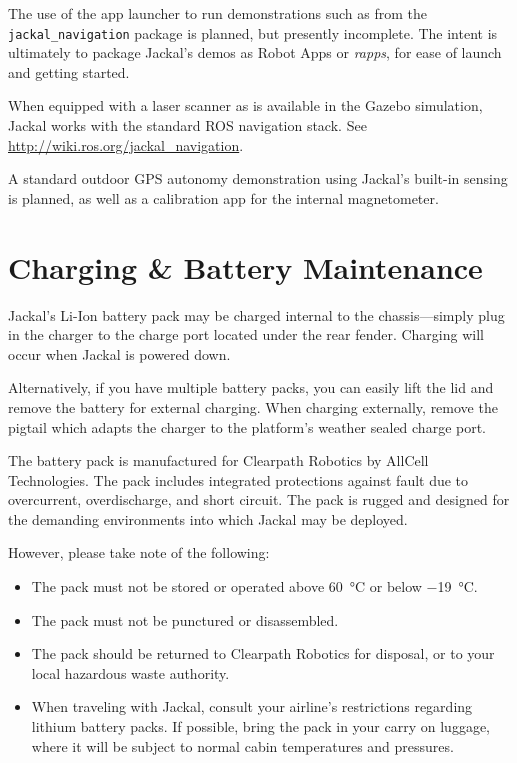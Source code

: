 \documentclass[]{clearpath-manual}
\begin{document}
\begin{warning}
The use of the app launcher to run demonstrations such as from the \lstinline{jackal_navigation}
package is planned, but presently incomplete. The intent is ultimately to package Jackal's demos as
Robot Apps or \textit{rapps}, for ease of launch and getting started.
\end{warning}

When equipped with a laser scanner as is available in the Gazebo simulation, Jackal works with the
standard ROS navigation stack. See \url{http://wiki.ros.org/jackal_navigation}.

A standard outdoor GPS autonomy demonstration using Jackal's built-in sensing is planned, as well
as a calibration app for the internal magnetometer.


\section{Charging \& Battery Maintenance}

Jackal's Li-Ion battery pack may be charged internal to the chassis---simply plug in
the charger to the charge port located under the rear fender. Charging will occur
when Jackal is powered down.

Alternatively, if you have multiple battery packs, you can easily lift the lid and
remove the battery for external charging. When charging externally, remove the pigtail
which adapts the charger to the platform's weather sealed charge port.

The battery pack is manufactured for Clearpath Robotics by AllCell Technologies. The
pack includes integrated protections against fault due to overcurrent, overdischarge,
and short circuit. The pack is rugged and designed for the demanding environments into
which Jackal may be deployed.

However, please take note of the following:

\begin{itemize}
\item The pack must not be stored or operated above \SI{60}{\celsius} or below \SI{-19}{\celsius}.
\item The pack must not be punctured or disassembled.
\item The pack should be returned to Clearpath Robotics for disposal, or to your
local hazardous waste authority.
\item When traveling with Jackal, consult your airline's restrictions regarding lithium
battery packs. If possible, bring the pack in your carry on luggage, where it will
be subject to normal cabin temperatures and pressures.
\end{itemize}
\end{document}
